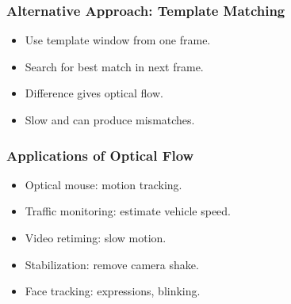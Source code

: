 \begin{frame}
  \frametitle{Alternative Approach: Template Matching}
\begin{itemize}
  \item Use template window from one frame.
  \item Search for best match in next frame.
  \item Difference gives optical flow.
  \item Slow and can produce mismatches.
\end{itemize}

\vspace{0.5cm}
\centering
\end{frame}

\begin{frame}
  \frametitle{Applications of Optical Flow}
\begin{itemize}
  \item Optical mouse: motion tracking.
  \item Traffic monitoring: estimate vehicle speed.
  \item Video retiming: slow motion.
  \item Stabilization: remove camera shake.
  \item Face tracking: expressions, blinking.
\end{itemize}

\vspace{0.5cm}
\centering
\end{frame}

